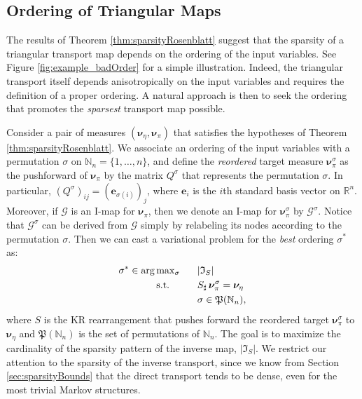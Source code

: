 \documentclass[twoside,11pt]{article}
\newcommand{\push}{_\sharp}                                      %
\newcommand{\genm}{\boldsymbol{\nu} }   %
\newcommand{\re}{\mathbb{R}}
\newcommand{\eb}{\boldsymbol{e}}
\newcommand{\Gcb}{\boldsymbol{\mathcal{G}}}
\newcommand{\Nbb}{\mathbb{N}}
\newcommand{\sparse}{ \mathfrak{I} }
\newcommand{\permset}{\mathfrak{P} }
\begin{document}
%
%
%
%
%
%
%
%
%
%

%
%
%
%
%
%
%
%
%
%

%
%
%
%
%
%
%
%
%
%
%
%
%
%
%
%
%
%
%
%
%

\subsection{Ordering of Triangular Maps}
\label{sec_order}
%
%
%
%
%
%
The results of Theorem \ref{thm:sparsityRosenblatt} suggest that the
sparsity of a triangular transport map depends on the ordering of the
input variables.  See Figure \ref{fig:example_badOrder} for a simple
illustration. Indeed, the triangular transport itself
depends anisotropically on the input variables and requires the
definition of a proper ordering.  A natural approach is then to seek
the ordering that promotes the {\it sparsest} transport map possible.
%
%

%
%
%
%
Consider a pair of measures 
$(\genm_\eta, \genm_\pi)$ 
that satisfies the hypotheses of Theorem \ref{thm:sparsityRosenblatt}.
We associate an ordering of the input variables with
a permutation $\sigma$ on $\Nbb_n=\{1,\ldots,n\}$,
and define the {\it reordered} target measure $\genm_{\pi}^\sigma$ 
as the 
pushforward of $\genm_\pi$ by 
%
the matrix $Q^\sigma$
that represents the permutation $\sigma$.
In particular, $(Q^\sigma)_{ij}=(\eb_{\sigma(i)})_j$, where
$\eb_i$ is the $i$th 
standard basis vector on $\re^n$.
%
%
Moreover, if $\Gcb$ is an I-map for $\genm_\pi$, then
we denote an I-map for $\genm_\pi^\sigma$ by $\Gcb^\sigma$. 
Notice that $\Gcb^\sigma$ can be derived from $\Gcb$ simply 
by relabeling its nodes according to the 
permutation $\sigma$. 
Then we can cast a variational problem for the
{\it best} ordering $\sigma^\ast$ as:
%
%
%
%
%
%
\begin{alignat}{2}  \label{bestOrdering}
  \sigma^* \in {\rm arg} 
  &\, {\rm max}_\sigma    & &\phantom{=} |  \sparse_S | \\
  &\, {\rm s.t.}     & &\phantom{=} S\push \, \genm_\pi^\sigma = \genm_\eta  \nonumber  \\
  &                & &\phantom{=} \sigma \in \permset(\Nbb_n),   \nonumber 
\end{alignat}
where $S$ is the KR rearrangement that pushes forward
the reordered target $\genm_\pi^\sigma$ to $\genm_\eta$ and $\permset(\Nbb_n)$ is
the set of permutations of $\mathbb{N}_n$. 
The goal is to maximize the
cardinality of the sparsity pattern of the inverse map,
$| \sparse_S |$. 
%
We
restrict our attention to the sparsity of the inverse transport, since
we know from Section \ref{sec:sparsityBounds} that the direct transport tends
to be dense, even for the most trivial Markov structures.
\end{document}
